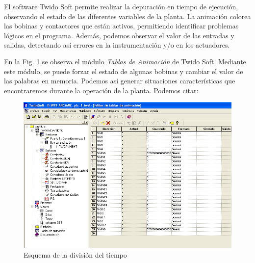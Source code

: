 El software Twido Soft permite realizar la depuración
en tiempo de ejecución, observando el estado de las diferentes variables
de la planta.
La animación colorea las bobinas y contactores que están activos, permitiendo
identificar problemas lógicos en el programa.
Además, podemos observar el valor de las entradas y salidas, detectando así
errores en la instrumentación y/o en los actuadores.

En la Fig. \ref{img:twidosoftdebug} se observa el módulo \emph{Tablas
de Animación} de Twido Soft.
Mediante este módulo, se puede forzar el estado de algunas bobinas y cambiar el
valor de las palabras en memoria.
Podemos así generar situaciones características que encontraremos durante la
operación de la planta.
Podemos citar:

\begin{figure}[ht]
	\centering
	\includegraphics[width=.8\textwidth]
	{Cap4-ProgramacionPLC/images/twidosoftdebug.png}
	\caption{Esquema de la división del tiempo}
	\label{img:twidosoftdebug}
\end{figure}

